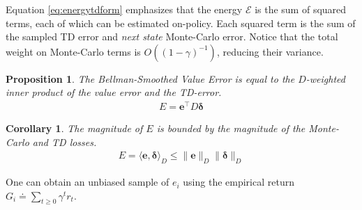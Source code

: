 \documentclass{article}
\theoremstyle{plain}
\newtheorem{proposition}[theorem]{Proposition}
\newtheorem{corollary}[theorem]{Corollary}
\theoremstyle{definition}
\theoremstyle{remark}
\begin{document}
Equation \ref{eq:energytdform} emphasizes that the energy $\mathcal{E}$ is the sum of
squared terms, each of which can be estimated on-policy. 
Each squared term is the sum of the sampled TD error and \textit{next state} Monte-Carlo error. Notice that the total weight on Monte-Carlo terms is $O((1-\gamma)^{-1})$, reducing their variance.


\begin{proposition}
The Bellman-Smoothed Value Error is equal to the 
$D$-weighted inner product of the value error and the TD-error.
\begin{align}
  E = \bm{e}^\intercal D \bm{\delta}
\end{align}
\end{proposition}

\begin{corollary}
  The magnitude of $E$ is bounded by the magnitude of the Monte-Carlo and TD losses.
  \begin{align}
  E = \langle \bm{e}, \bm{\delta} \rangle_D \le \|\bm{e}\|_D \|\bm{\delta}\|_D
  \end{align}
\end{corollary}

One can obtain an unbiased sample of $e_i$ using the empirical return $G_i \doteq \sum_{t\geq 0} \gamma^t r_t$.
\end{document}
